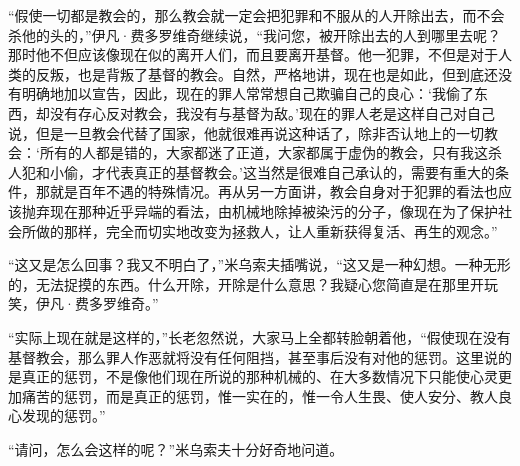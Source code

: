 \par “假使一切都是教会的，那么教会就一定会把犯罪和不服从的人开除出去，而不会杀他的头的，”伊凡·费多罗维奇继续说，“我问您，被开除出去的人到哪里去呢？那时他不但应该像现在似的离开人们，而且要离开基督。他一犯罪，不但是对于人类的反叛，也是背叛了基督的教会。自然，严格地讲，现在也是如此，但到底还没有明确地加以宣告，因此，现在的罪人常常想自己欺骗自己的良心：‘我偷了东西，却没有存心反对教会，我没有与基督为敌。’现在的罪人老是这样自己对自己说，但是一旦教会代替了国家，他就很难再说这种话了，除非否认地上的一切教会：‘所有的人都是错的，大家都迷了正道，大家都属于虚伪的教会，只有我这杀人犯和小偷，才代表真正的基督教会。’这当然是很难自己承认的，需要有重大的条件，那就是百年不遇的特殊情况。再从另一方面讲，教会自身对于犯罪的看法也应该抛弃现在那种近乎异端的看法，由机械地除掉被染污的分子，像现在为了保护社会所做的那样，完全而切实地改变为拯救人，让人重新获得复活、再生的观念。”
\par “这又是怎么回事？我又不明白了，”米乌索夫插嘴说，“这又是一种幻想。一种无形的，无法捉摸的东西。什么开除，开除是什么意思？我疑心您简直是在那里开玩笑，伊凡·费多罗维奇。”
\par “实际上现在就是这样的，”长老忽然说，大家马上全都转脸朝着他，“假使现在没有基督教会，那么罪人作恶就将没有任何阻挡，甚至事后没有对他的惩罚。这里说的是真正的惩罚，不是像他们现在所说的那种机械的、在大多数情况下只能使心灵更加痛苦的惩罚，而是真正的惩罚，惟一实在的，惟一令人生畏、使人安分、教人良心发现的惩罚。”
\par “请问，怎么会这样的呢？”米乌索夫十分好奇地问道。
